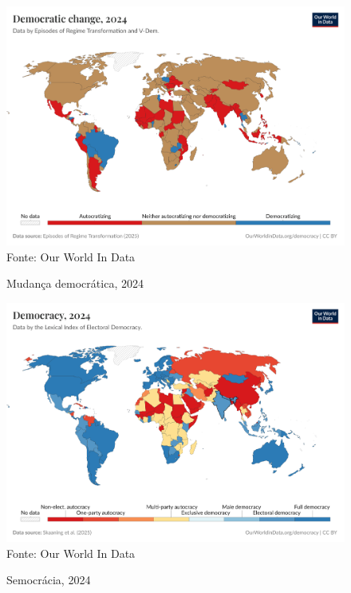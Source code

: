 \begin{figure}[ht]
    \centering
    \caption{Mudança democrática, 2024}
    \includegraphics[width=1\linewidth]{figuras/democracia/political-regime-ert.png}
    \label{fig:political-regime-ert}
    \footnotesize{Fonte: Our World In Data}
\end{figure}

\begin{figure}[ht]
    \centering
    \caption{Semocrácia, 2024}
    \includegraphics[width=1\linewidth]{figuras/democracia/political-regime-lexical.png}
    \label{fig:political-regime-lexical}
    \footnotesize{Fonte: Our World In Data}
\end{figure}

